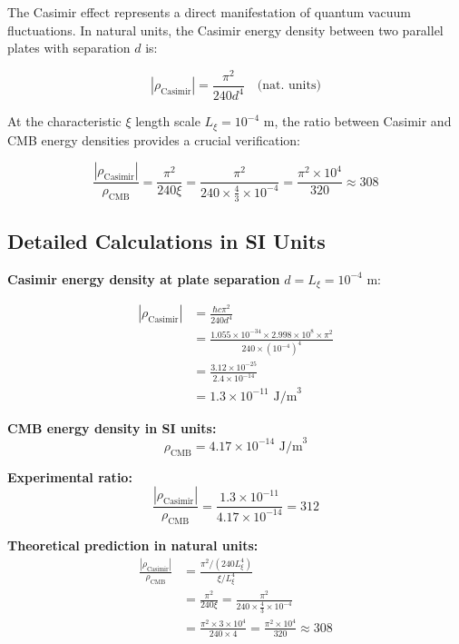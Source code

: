 	The Casimir effect represents a direct manifestation of quantum vacuum fluctuations. In natural units, the Casimir energy density between two parallel plates with separation $d$ is:
	
	\begin{equation}
		|\rho_{\text{Casimir}}| = \frac{\pi^2}{240 d^4} \quad \text{(nat. units)}
	\end{equation}
	
	At the characteristic $\xi$ length scale $L_\xi = 10^{-4}$ m, the ratio between Casimir and CMB energy densities provides a crucial verification:
	
	\begin{equation}
		\frac{|\rho_{\text{Casimir}}|}{\rho_{\text{CMB}}} = \frac{\pi^2}{240 \xi} = \frac{\pi^2}{240 \times \frac{4}{3} \times 10^{-4}} = \frac{\pi^2 \times 10^4}{320} \approx 308
	\end{equation}
	
	\subsection{Detailed Calculations in SI Units}
	
	\textbf{Casimir energy density at plate separation} $d = L_\xi = 10^{-4}$ m:
	
	\begin{align}
		|\rho_{\text{Casimir}}| &= \frac{\hbar c \pi^2}{240 d^4} \\
		&= \frac{1.055 \times 10^{-34} \times 2.998 \times 10^8 \times \pi^2}{240 \times (10^{-4})^4} \\
		&= \frac{3.12 \times 10^{-25}}{2.4 \times 10^{-14}} \\
		&= 1.3 \times 10^{-11} \text{ J/m}^3
	\end{align}
	
	\textbf{CMB energy density in SI units:}
	\begin{equation}
		\rho_{\text{CMB}} = 4.17 \times 10^{-14} \text{ J/m}^3
	\end{equation}
	
	\textbf{Experimental ratio:}
	\begin{equation}
		\frac{|\rho_{\text{Casimir}}|}{\rho_{\text{CMB}}} = \frac{1.3 \times 10^{-11}}{4.17 \times 10^{-14}} = 312
	\end{equation}
	
	\textbf{Theoretical prediction in natural units:}
	\begin{align}
		\frac{|\rho_{\text{Casimir}}|}{\rho_{\text{CMB}}} &= \frac{\pi^2 / (240 L_\xi^4)}{\xi / L_\xi^4} \\
		&= \frac{\pi^2}{240 \xi} = \frac{\pi^2}{240 \times \frac{4}{3} \times 10^{-4}} \\
		&= \frac{\pi^2 \times 3 \times 10^4}{240 \times 4} = \frac{\pi^2 \times 10^4}{320} \approx 308
	\end{align}
	
